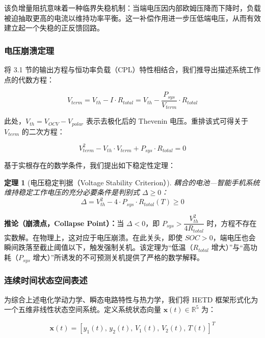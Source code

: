 \documentclass[11pt,a4paper]{ctexart}
\newtheorem{theorem}{定理}
\begin{document}
该负增量阻抗意味着一种临界失稳机制：当端电压因内部欧姆压降而下降时，负载被迫抽取更高的电流以维持功率平衡。这一补偿作用进一步压低端电压，从而有效建立起一个失稳的正反馈回路。

\subsubsection{电压崩溃定理}

将 3.1 节的输出方程与恒功率负载（CPL）特性相结合，我们推导出描述系统工作点的代数方程：

\begin{equation}
V_{term} = V_{th} - I \cdot R_{total} = V_{th} - \frac{P_{sys}}{V_{term}} \cdot R_{total}
\end{equation}

此处，$V_{th} = V_{OCV} - V_{polar}$ 表示去极化后的 Thevenin 电压。重排该式可得关于 $V_{term}$ 的二次方程：

\begin{equation}
V_{term}^2 - V_{th} \cdot V_{term} + P_{sys} \cdot R_{total} = 0
\end{equation}

基于实根存在的数学条件，我们提出如下稳定性定理：

\begin{theorem}[电压稳定判据（Voltage Stability Criterion）]
耦合的电池—智能手机系统维持稳定工作电压的充分必要条件是判别式 $\Delta \ge 0$：
\begin{equation}
\Delta = V_{th}^2 - 4 \cdot P_{sys} \cdot R_{total}(T) \ge 0
\end{equation}
\end{theorem}

\noindent\textbf{推论（崩溃点，Collapse Point）：}当 $\Delta < 0$，即 $P_{sys} > \dfrac{V_{th}^2}{4R_{total}}$ 时，方程不存在实数解。在物理上，这对应于电压崩溃。在此关头，即使 $SOC > 0$，端电压也会瞬间跌落至截止阈值以下，触发强制关机。该定理为“低温（$R_{total}$ 增大）”与“高功耗（$P_{sys}$ 增大）”所诱发的不可预测关机提供了严格的数学解释。

\subsubsection{连续时间状态空间表述}

为综合上述电化学动力学、瞬态电路特性与热力学，我们将 HETD 框架形式化为一个五维非线性状态空间系统。定义系统状态向量 $\mathbf{x}(t) \in \mathbb{R}^5$ 为：

\begin{equation}
\mathbf{x}(t) = \left[y_1(t),\, y_2(t),\, V_1(t),\, V_2(t),\, T(t)\right]^{T}
\end{equation}
\end{document}
